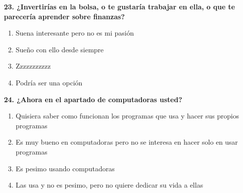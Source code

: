 \documentclass{article}
\begin{document}
\textbf{23. ¿Invertirías en la bolsa, o te gustaría trabajar en ella, o que te parecería aprender sobre finanzas?  }
\begin{enumerate}
[label=(\Alph*)]
\item Suena interesante pero no es mi pasión
\item Sueño con ello desde siempre
\item Zzzzzzzzzzz
\item Podría ser una opción
\end{enumerate}



 \textbf{24. ¿Ahora en el apartado de computadoras usted?}
 \begin{enumerate}[label=(\Alph*)]
 \item Quisiera saber como funcionan los programas que usa y hacer sus propios programas
 \item Es muy bueno en computadoras pero no se interesa en hacer solo en usar programas
 \item Es pesimo usando computadoras 
 \item Las usa y no es pesimo, pero no quiere dedicar su vida a ellas 
 \end{enumerate}

 
\end{document}
